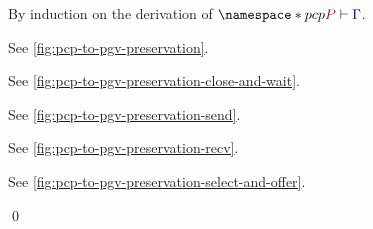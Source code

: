 \proof
\label{prf:lem-pcp-to-pgv-terms-preservation}
By induction on the derivation of $\pcp{\seq{P}{\ty{\Gamma}}}$.
\begin{case*}
  See \cref{fig:pcp-to-pgv-preservation}.
\end{case*}
\begin{case*}
  See \cref{fig:pcp-to-pgv-preservation-close-and-wait}.
\end{case*}
\begin{case*}
  See \cref{fig:pcp-to-pgv-preservation-send}.
\end{case*}
\begin{case*}
  See \cref{fig:pcp-to-pgv-preservation-recv}.
\end{case*}
\begin{case*}
  See \cref{fig:pcp-to-pgv-preservation-select-and-offer}.
\end{case*}
\qed
